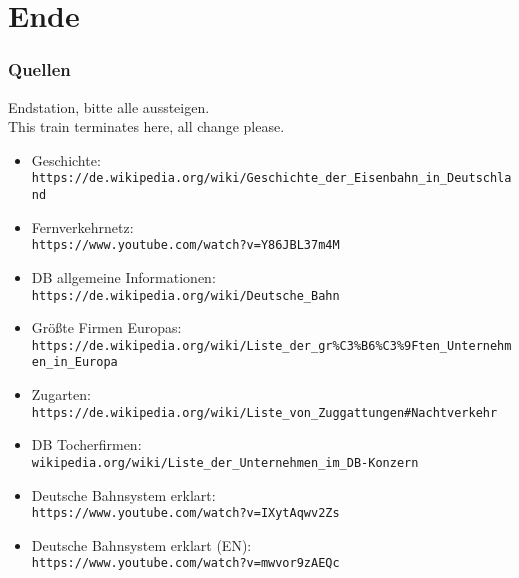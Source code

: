 \section{Ende}

\begin{frame}[fragile]
	\frametitle{Quellen}
	\centering
	{\uacht Endstation, bitte alle aussteigen.\\
	\gillsans This train terminates here, all change please.}\\[4ex]

	\begin{itemize}
		\item \small Geschichte: \\
		\tiny\verb+https://de.wikipedia.org/wiki/Geschichte_der_Eisenbahn_in_Deutschland+
		\item \small Fernverkehrnetz: \\
		\tiny\verb+https://www.youtube.com/watch?v=Y86JBL37m4M+
		\item \small DB allgemeine Informationen: \\
		\tiny\verb+https://de.wikipedia.org/wiki/Deutsche_Bahn+
		\item \small Größte Firmen Europas: \\
		\tiny \verb+https://de.wikipedia.org/wiki/Liste_der_gr%C3%B6%C3%9Ften_Unternehmen_in_Europa+
		\item \small Zugarten: \\
		\tiny \verb+https://de.wikipedia.org/wiki/Liste_von_Zuggattungen#Nachtverkehr+
		\item \small DB Tocherfirmen: \\
		\tiny \verb+wikipedia.org/wiki/Liste_der_Unternehmen_im_DB-Konzern+
		\item \small Deutsche Bahnsystem erklart: \\
		\tiny \verb+https://www.youtube.com/watch?v=IXytAqwv2Zs+
		\item \small Deutsche Bahnsystem erklart (EN):\\
		\tiny \verb+https://www.youtube.com/watch?v=mwvor9zAEQc+
	\end{itemize}
\end{frame}
